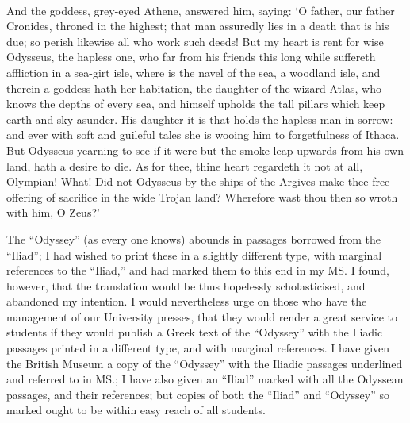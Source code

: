 \documentclass[12pt,letter]{article}
\begin{document}
    \paragraph{}
    And the goddess, grey-eyed Athene, answered him, saying: ‘O father,
    our father Cronides, throned in the highest; that man assuredly
    lies in a death that is his due; so perish likewise all who work
    such deeds! But my heart is rent for wise Odysseus, the hapless
    one, who far from his friends this long while suffereth affliction
    in a sea-girt isle, where is the navel of the sea, a woodland isle,
    and therein a goddess hath her habitation, the daughter of the
    wizard Atlas, who knows the depths of every sea, and himself
    upholds the tall pillars which keep earth and sky asunder. His
    daughter it is that holds the hapless man in sorrow: and ever with
    soft and guileful tales she is wooing him to forgetfulness of
    Ithaca. But Odysseus yearning to see if it were but the smoke leap
    upwards from his own land, hath a desire to die. As for thee, thine
    heart regardeth it not at all, Olympian! What! Did not Odysseus by
    the ships of the Argives make thee free offering of sacrifice in
    the wide Trojan land? Wherefore wast thou then so wroth with him, O
    Zeus?’


The “Odyssey” (as every one knows) abounds in passages borrowed from
the “Iliad”; I had wished to print these in a slightly different type,
with marginal references to the “Iliad,” and had marked them to this
end in my MS. I found, however, that the translation would be thus
hopelessly scholasticised, and abandoned my intention. I would
nevertheless urge on those who have the management of our University
presses, that they would render a great service to students if they
would publish a Greek text of the “Odyssey” with the Iliadic passages
printed in a different type, and with marginal references. I have given
the British Museum a copy of the “Odyssey” with the Iliadic passages
underlined and referred to in MS.; I have also given an “Iliad” marked
with all the Odyssean passages, and their references; but copies of
both the “Iliad” and “Odyssey” so marked ought to be within easy reach
of all students.
\end{document}
